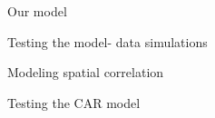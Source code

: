 \documentclass{beamer}
\begin{document}
\begin{frame}{Our model}
\end{frame}

\begin{frame}{Testing the model- data simulations}
\end{frame}

\begin{frame}{Modeling spatial correlation}
\end{frame}

\begin{frame}{Testing the CAR model}
\end{frame}
\end{document}
